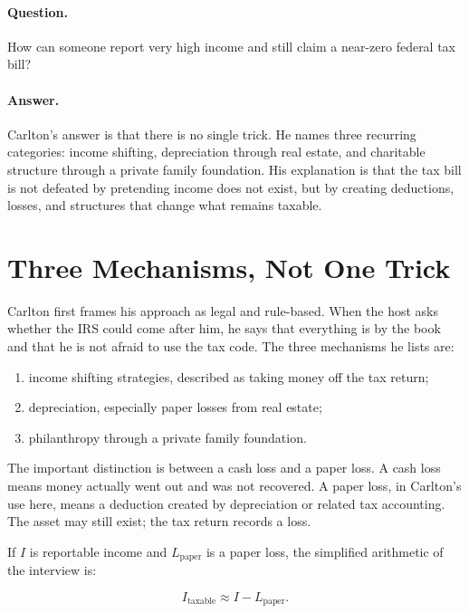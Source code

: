 \paragraph{Question.}
How can someone report very high income and still claim a near-zero federal tax bill?

\paragraph{Answer.}
Carlton's answer is that there is no single trick. He names three recurring categories: income shifting, depreciation through real estate, and charitable structure through a private family foundation. His explanation is that the tax bill is not defeated by pretending income does not exist, but by creating deductions, losses, and structures that change what remains taxable.

\section{Three Mechanisms, Not One Trick}

Carlton first frames his approach as legal and rule-based. When the host asks whether the IRS could come after him, he says that everything is by the book and that he is not afraid to use the tax code. The three mechanisms he lists are:

\begin{enumerate}
\item income shifting strategies, described as taking money off the tax return;
\item depreciation, especially paper losses from real estate;
\item philanthropy through a private family foundation.
\end{enumerate}

The important distinction is between a cash loss and a paper loss. A cash loss means money actually went out and was not recovered. A paper loss, in Carlton's use here, means a deduction created by depreciation or related tax accounting. The asset may still exist; the tax return records a loss.

If \(I\) is reportable income and \(L_{\mathrm{paper}}\) is a paper loss, the simplified arithmetic of the interview is:

\begin{equation}
I_{\mathrm{taxable}} \approx I - L_{\mathrm{paper}}.
\end{equation}

